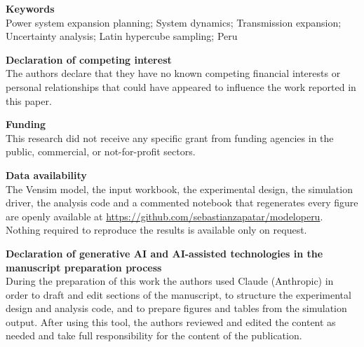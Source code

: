 \documentclass[11pt]{article}
\begin{document}
\vspace{1.4em}

\noindent\textbf{Keywords}\\[2pt]
Power system expansion planning; System dynamics; Transmission expansion;
Uncertainty analysis; Latin hypercube sampling; Peru

\vspace{1.4em}

\noindent\textbf{Declaration of competing interest}\\[2pt]
The authors declare that they have no known competing financial interests or
personal relationships that could have appeared to influence the work reported in
this paper.

\vspace{1.0em}

\noindent\textbf{Funding}\\[2pt]
This research did not receive any specific grant from funding agencies in the
public, commercial, or not-for-profit sectors.

\vspace{1.0em}

\noindent\textbf{Data availability}\\[2pt]
The Vensim model, the input workbook, the experimental design, the simulation
driver, the analysis code and a commented notebook that regenerates every figure are
openly available at \url{https://github.com/sebastianzapatar/modeloperu}.
Nothing required to reproduce
the results is available only on request.

\vspace{1.0em}

\noindent\textbf{Declaration of generative AI and AI-assisted technologies in the
manuscript preparation process}\\[2pt]
During the preparation of this work the authors used Claude (Anthropic) in order to
draft and edit sections of the manuscript, to structure the experimental design and
analysis code, and to prepare figures and tables from the simulation output. After
using this tool, the authors reviewed and edited the content as needed and take full
responsibility for the content of the publication.
\end{document}
